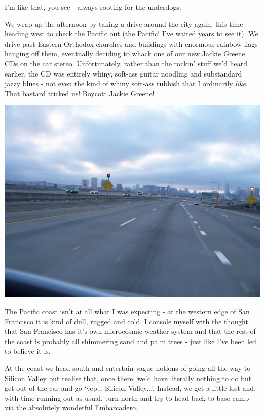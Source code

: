 \documentclass[a5paper,titlepage,11pt]{book}
\begin{document}
I'm like that, you see - always rooting for the underdogs.

We wrap up the afternoon by taking a drive around the city again, this time heading west to check the Pacific out (the Pacific! I've waited years to see it).  We drive past Eastern Orthodox churches and buildings with enormous rainbow flags hanging off them, eventually deciding to whack one of our new Jackie Greene CDs on the car stereo.  Unfortunately, rather than the rockin' stuff we'd heard earlier, the CD was entirely whiny, soft-ass guitar noodling and substandard jazzy blues - not even the kind of whiny soft-ass rubbish that I ordinarily \emph{like}.  That bastard tricked us!  Boycott Jackie Greene!

\begin{center}\includegraphics[width=\textwidth]{gfx/100_1076}\end{center}

The Pacific coast isn't at all what I was expecting - at the western edge of San Francisco it is kind of dull, rugged and cold.  I console myself with the thought that San Francisco has it's own microcosmic weather system and that the rest of the coast is probably all shimmering sand and palm trees - just like I've been led to believe it is.

At the coast we head south and entertain vague notions of going all the way to Silicon Valley but realise that, once there, we'd have literally nothing to do but get out of the car and go `yep... Silicon Valley...'.  Instead, we get a little lost and, with time running out as usual, turn north and try to head back to base camp via the absolutely wonderful Embarcadero.
\end{document}
